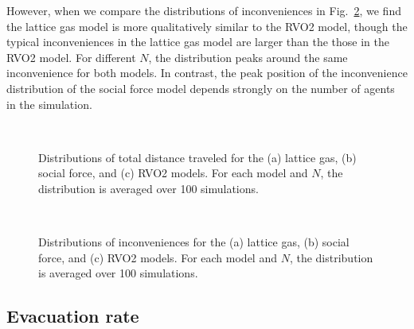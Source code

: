 However, when we compare the distributions of inconveniences in Fig.~\ref{fig:Incon}, we find the lattice gas model is more qualitatively similar to the RVO2 model, though the typical inconveniences in the lattice gas model are larger than the those in the RVO2 model. For different $N$, the distribution peaks around the same inconvenience for both models. In contrast, the peak position of the inconvenience distribution of the social force model depends strongly on the number of agents in the simulation.


\begin{figure}[htbp]
\centering
{}
\hspace{1cm}
\\
\caption{Distributions of total distance traveled for the (a) lattice gas, (b) social force, and (c) RVO2 models. For each model and $N$, the distribution is averaged over 100 simulations.}
\label{fig:TravelDist}
\end{figure}

\begin{figure}[htbp]
\centering
{}
\hspace{1cm}
\\
\caption{Distributions of inconveniences for the (a) lattice gas, (b) social force, and (c) RVO2 models. For each model and $N$, the distribution is averaged over 100 simulations.}
\label{fig:Incon}
\end{figure}



\subsection{Evacuation rate}

